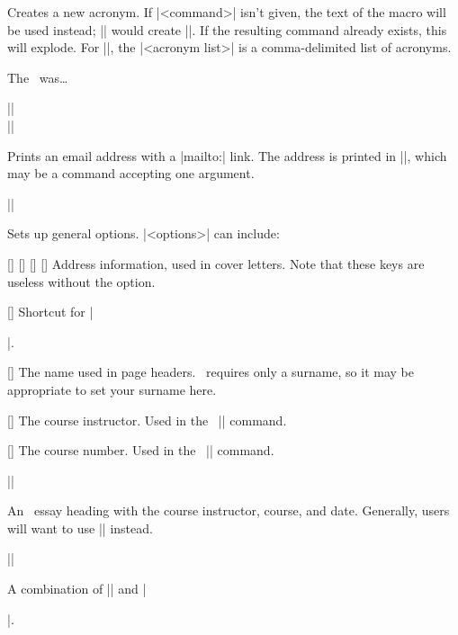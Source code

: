 \documentclass{ltxguidex}
\begin{document}
Creates a new acronym. If |<command>| isn't given, the text of the macro
will be used instead; || would create |\mla|. If the
resulting command already exists, this will explode. For |\newacronyms|, the
|<acronym list>| is a comma-delimited list of acronyms.

\begin{LTXexample}
\xyz

The \ussr\ was\dots
\end{LTXexample}

\begin{desc}
||\\
||
\end{desc}

Prints an email address with a |mailto:| link. The address is printed in
|\emailstyle|, which may be a command accepting one argument.

\begin{desc}
||
\end{desc}

Sets up general options. |<options>| can include:
\begin{keys}
	[]
	[]
	[]
	[]
	Address information, used in cover letters. Note that these keys are
	useless without the  option.

	[]
	Shortcut for |\author{<author>}|.

	[]
	The name used in page headers. \mla\ requires only a surname, so it
	may be appropriate to set your surname here.

	[]
	The course instructor. Used in the \mla\ |\intro| command.

	[]
	The course number. Used in the \mla\ |\intro| command.
\end{keys}

\begin{desc}
|\heading|
\end{desc}
An \mla\ essay heading with the course instructor, course, and date.
Generally, users will want to use |\intro| instead.

\begin{desc}
|\intro|
\end{desc}
A combination of |\heading| and |\maketitle|.
\end{document}
